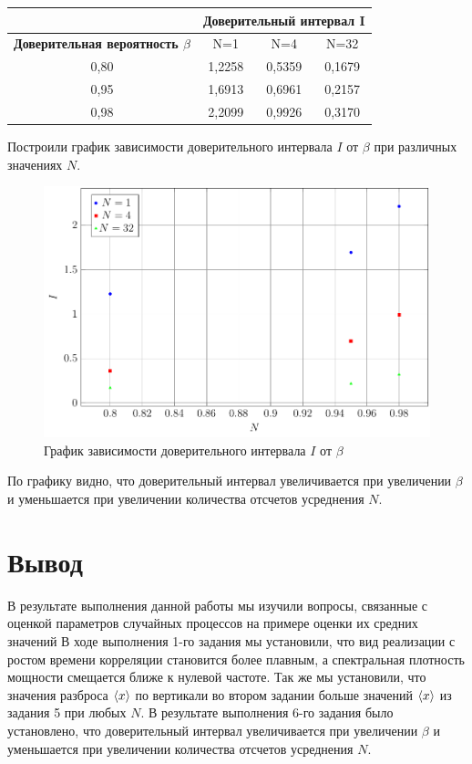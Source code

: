 \begin{table}[htbp]
	\centering
	\begin{tabular}{|c|c|c|c|}
		\toprule
		\multicolumn{1}{|c|}{} & \multicolumn{3}{c|}{Доверительный интервал I} \\
		\midrule
		\textbf{Доверительная вероятность $\beta$} & N=1 & N=4 & N=32 \\
		\midrule
		0,80  & 1,2258 & 0,5359 & 0,1679 \\
		\midrule
		0,95  & 1,6913 & 0,6961 & 0,2157 \\
		\midrule
		0,98  & 2,2099 & 0,9926 & 0,3170 \\
		\bottomrule
	\end{tabular}%
\end{table}%
Построили график зависимости доверительного интервала $I$ от $\beta$ при различных значениях $N$.
 \begin{figure}[H]
	\centering
	\includegraphics[width=0.8\linewidth]{tasks/plot6_2}
	\caption*{График зависимости доверительного интервала $I$ от $\beta$}
\end{figure}
По графику видно, что доверительный интервал увеличивается при увеличении $\beta$ и уменьшается при увеличении количества отсчетов усреднения $N$.
\section{Вывод}
В результате выполнения данной работы мы изучили вопросы, связанные с оценкой параметров случайных процессов на примере оценки их средних значений
В ходе выполнения 1-го задания мы установили, что вид реализации с ростом времени корреляции становится более плавным, а спектральная плотность мощности смещается ближе к нулевой частоте.
Так же мы установили, что значения разброса $\langle x\rangle$ по вертикали во втором задании больше значений $\langle x\rangle$ из задания 5 при любых $N$.
В результате выполнения 6-го задания было установлено, что доверительный интервал увеличивается при увеличении $\beta$ и уменьшается при увеличении количества отсчетов усреднения $N$.


